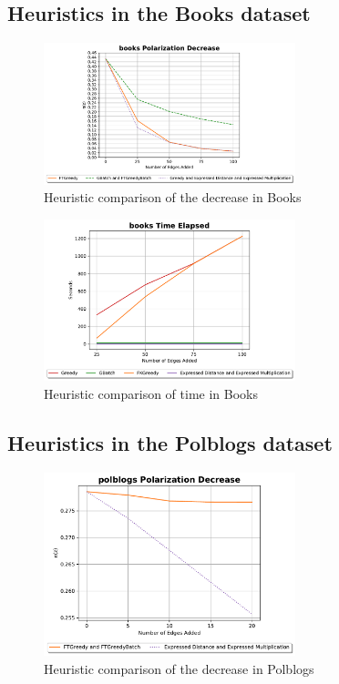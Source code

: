 \clearpage

\subsection{Heuristics in the Books dataset}

\begin{figure}[!htbp]
	\centering
	\includegraphics[width=0.65\textwidth]{Figures/books Polarization Decrease}
	\caption{Heuristic comparison of the decrease in Books}
	\label{fig:books_pol}
\end{figure}


\begin{figure}[!htbp]
	\centering
	\includegraphics[width=0.65\textwidth]{Figures/books Time Elapsed}
	\caption{Heuristic comparison of time in Books}
	\label{fig:books_time}
\end{figure}

\subsection{Heuristics in the Polblogs dataset}

\begin{figure}[H]
	\centering
	\includegraphics[width=0.65\textwidth]{Figures/polblogs Polarization Decrease}
	\caption{Heuristic comparison of the decrease in Polblogs}
	\label{fig:polblogs_pol}
\end{figure}


